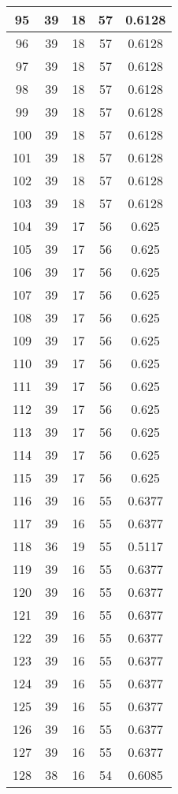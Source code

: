 \documentclass[letterpaper, 12pt]{article}
\begin{document}
\begin{longtable}{|c|c|c|c|c|}
\hline
95 & 39 & 18 & 57 & 0.6128 \\
\hline
96 & 39 & 18 & 57 & 0.6128 \\
\hline
97 & 39 & 18 & 57 & 0.6128 \\
\hline
98 & 39 & 18 & 57 & 0.6128 \\
\hline
99 & 39 & 18 & 57 & 0.6128 \\
\hline
100 & 39 & 18 & 57 & 0.6128 \\
\hline
101 & 39 & 18 & 57 & 0.6128 \\
\hline
102 & 39 & 18 & 57 & 0.6128 \\
\hline
103 & 39 & 18 & 57 & 0.6128 \\
\hline
104 & 39 & 17 & 56 & 0.625 \\
\hline
105 & 39 & 17 & 56 & 0.625 \\
\hline
106 & 39 & 17 & 56 & 0.625 \\
\hline
107 & 39 & 17 & 56 & 0.625 \\
\hline
108 & 39 & 17 & 56 & 0.625 \\
\hline
109 & 39 & 17 & 56 & 0.625 \\
\hline
110 & 39 & 17 & 56 & 0.625 \\
\hline
111 & 39 & 17 & 56 & 0.625 \\
\hline
112 & 39 & 17 & 56 & 0.625 \\
\hline
113 & 39 & 17 & 56 & 0.625 \\
\hline
114 & 39 & 17 & 56 & 0.625 \\
\hline
115 & 39 & 17 & 56 & 0.625 \\
\hline
116 & 39 & 16 & 55 & 0.6377 \\
\hline
117 & 39 & 16 & 55 & 0.6377 \\
\hline
118 & 36 & 19 & 55 & 0.5117 \\
\hline
119 & 39 & 16 & 55 & 0.6377 \\
\hline
120 & 39 & 16 & 55 & 0.6377 \\
\hline
121 & 39 & 16 & 55 & 0.6377 \\
\hline
122 & 39 & 16 & 55 & 0.6377 \\
\hline
123 & 39 & 16 & 55 & 0.6377 \\
\hline
124 & 39 & 16 & 55 & 0.6377 \\
\hline
125 & 39 & 16 & 55 & 0.6377 \\
\hline
126 & 39 & 16 & 55 & 0.6377 \\
\hline
127 & 39 & 16 & 55 & 0.6377 \\
\hline
128 & 38 & 16 & 54 & 0.6085 \\

\end{longtable}
\end{document}
